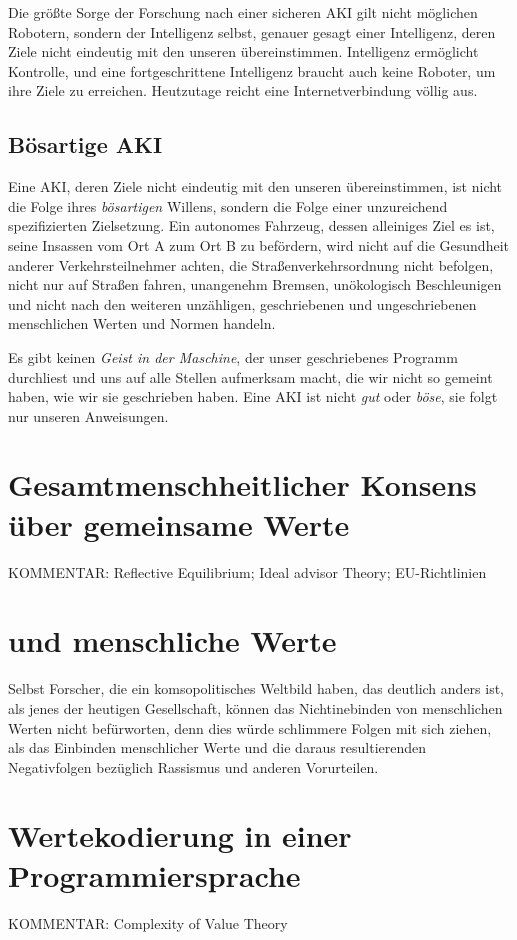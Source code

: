 Die größte Sorge der Forschung nach einer sicheren AKI gilt nicht möglichen Robotern, sondern der Intelligenz selbst, genauer gesagt einer Intelligenz, deren Ziele nicht eindeutig mit den unseren übereinstimmen. Intelligenz ermöglicht Kontrolle, und eine fortgeschrittene Intelligenz braucht auch keine Roboter, um ihre Ziele zu erreichen. Heutzutage reicht eine Internetverbindung völlig aus. 
\subsection{Bösartige AKI}
Eine AKI, deren Ziele nicht eindeutig mit den unseren übereinstimmen, ist nicht die Folge ihres \emph{bösartigen} Willens, sondern die Folge einer unzureichend spezifizierten Zielsetzung. Ein autonomes Fahrzeug, dessen alleiniges Ziel es ist, seine Insassen vom Ort A zum Ort B zu befördern, wird nicht auf die Gesundheit anderer Verkehrsteilnehmer achten, die Straßenverkehrsordnung nicht befolgen, nicht nur auf Straßen fahren, unangenehm Bremsen, unökologisch Beschleunigen und nicht nach den weiteren unzähligen, geschriebenen und ungeschriebenen menschlichen Werten und Normen handeln.

Es gibt keinen \emph{Geist in der Maschine}, der unser geschriebenes Programm durchliest und uns auf alle Stellen aufmerksam macht, die wir nicht so gemeint haben, wie wir sie geschrieben haben. Eine AKI ist nicht \emph{gut} oder \emph{böse}, sie folgt nur unseren Anweisungen. 
\section{Gesamtmenschheitlicher Konsens über gemeinsame Werte}
KOMMENTAR: Reflective Equilibrium; Ideal advisor Theory; EU-Richtlinien
\section{ und  menschliche Werte}
Selbst Forscher, die ein komsopolitisches Weltbild haben, das deutlich anders ist, als jenes der heutigen Gesellschaft, können das Nichtinebinden von menschlichen Werten nicht befürworten, denn dies würde schlimmere Folgen mit sich ziehen, als das Einbinden menschlicher Werte und die daraus resultierenden Negativfolgen bezüglich Rassismus und anderen Vorurteilen.
\section{Wertekodierung in einer Programmiersprache}
KOMMENTAR: Complexity of Value Theory
